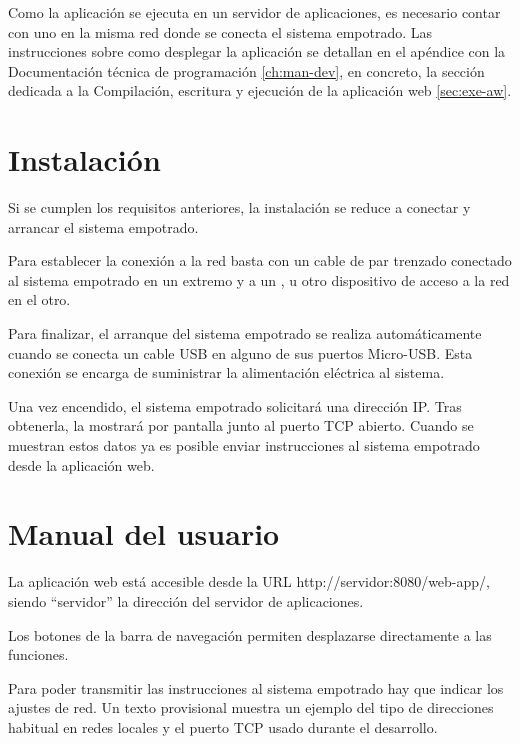 Como la aplicación se ejecuta en un servidor de aplicaciones, es necesario
contar con uno en la misma red donde se conecta el sistema empotrado. Las
instrucciones sobre como desplegar la aplicación se detallan en el apéndice
con la Documentación técnica de programación \ref{ch:man-dev}, en concreto, la
sección dedicada a la Compilación, escritura y ejecución de la aplicación web
\ref{sec:exe-aw}.



\section{Instalación} \label{sec:man-user-inst}
Si se cumplen los requisitos anteriores, la instalación se reduce a conectar y
arrancar el sistema empotrado.

Para establecer la conexión a la red basta con un cable de par trenzado
conectado al sistema empotrado en un extremo y a un ,
 u otro dispositivo de acceso a la red en el
otro.

Para finalizar, el arranque del sistema empotrado se realiza automáticamente
cuando se conecta un cable USB en alguno de sus puertos Micro-USB. Esta conexión
se encarga de suministrar la alimentación eléctrica al sistema.


Una vez encendido, el sistema empotrado solicitará una dirección IP. Tras
obtenerla, la mostrará por pantalla junto al puerto TCP abierto.
Cuando se muestran estos datos ya es posible enviar instrucciones al sistema
empotrado desde la aplicación web.



\section{Manual del usuario} \label{sec:man-user}
La aplicación web está accesible desde la URL http://servidor:8080/web-app/,
siendo ``servidor'' la dirección del servidor de aplicaciones.


Los botones de la barra de navegación permiten desplazarse directamente a las
funciones.


Para poder transmitir las instrucciones al sistema empotrado hay que indicar
los ajustes de red. Un texto provisional muestra un ejemplo del tipo de
direcciones habitual en redes locales y el puerto TCP usado durante el
desarrollo.

